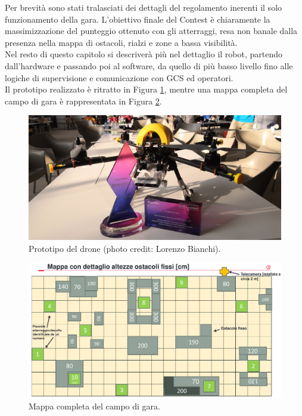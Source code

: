 Per brevità sono stati tralasciati dei dettagli del regolamento inerenti il solo funzionamento della gara. L'obiettivo finale del Contest è chiaramente la massimizzazione del punteggio ottenuto con gli atterraggi, resa non banale dalla presenza nella mappa di ostacoli, rialzi e zone a bassa visibilità.\\
Nel resto di questo capitolo si descriverà più nel dettaglio il robot, partendo dall'hardware e passando poi al software, da quello di più basso livello fino alle logiche di supervisione e comunicazione con GCS ed operatori.\\
Il prototipo realizzato è ritratto in Figura \ref{fig:drone}, mentre una mappa completa del campo di gara è rappresentata in Figura \ref{fig:map}.

\begin{figure}
    \centering
    \includegraphics[width=\textwidth]{figs/chapter3/drone.jpg}
    \caption{Prototipo del drone (photo credit: Lorenzo Bianchi).}
    \label{fig:drone}
\end{figure}

\begin{figure}
    \centering
    \includegraphics[width=\textwidth]{figs/chapter3/campogara.png}
    \caption{Mappa completa del campo di gara.}
    \label{fig:map}
\end{figure}
\clearpage

